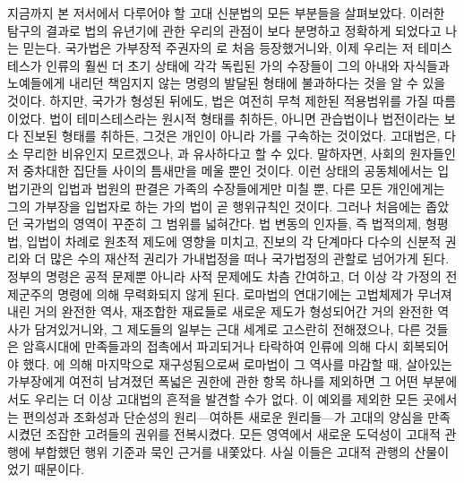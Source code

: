 지금까지 본 저서에서 다루어야 할 고대 신분법의 모든 부분들을 살펴보았다.
이러한 탐구의 결과로
법의 유년기에 관한 우리의 관점이 보다 분명하고 정확하게 되었다고
나는 믿는다.
국가법은
가부장적 주권자의 로
처음 등장했거니와,
이제 우리는
저 테미스테스가
인류의 훨씬 더 초기 상태에
각각 독립된 가의 수장들이 그의 아내와 자식들과 노예들에게 내리던
책임지지 않는 명령의
발달된 형태에 불과하다는 것을
알 수 있을 것이다.
하지만, 국가가 형성된 뒤에도,
법은 여전히 무척 제한된 적용범위를 가질 따름이었다.
법이 테미스테스라는 원시적 형태를 취하든,
아니면 관습법이나 법전이라는 보다 진보된 형태를 취하든,
그것은 개인이 아니라 가를 구속하는 것이었다.
고대법은,
다소 무리한 비유인지 모르겠으나, 과 유사하다고 할 수 있다.
말하자면, 사회의 원자들인 저 중차대한 집단들 사이의 틈새만을 메울 뿐인 것이다.
이런 상태의 공동체에서는
입법기관의 입법과 법원의 판결은
가족의 수장들에게만 미칠 뿐,
다른 모든 개인에게는
그의 가부장을 입법자로 하는
가의 법이 곧 행위규칙인 것이다.
그러나 처음에는 좁았던 국가법의 영역이 꾸준히 그 범위를 넓혀간다.
법 변동의 인자들, 즉
법적의제, 형평법, 입법이 차례로 원초적 제도에 영향을 미치고,
진보의 각 단계마다
다수의 신분적 권리와 더 많은 수의 재산적 권리가
가내법정을 떠나 국가법정의 관할로 넘어가게 된다.
정부의 명령은 공적 문제뿐 아니라 사적 문제에도 차츰 간여하고,
더 이상 각 가정의 전제군주의 명령에 의해 무력화되지 않게 된다.
로마법의 연대기에는
고법체제가 무너져내린 거의 완전한 역사,
재조합한 재료들로 새로운 제도가 형성되어간
거의 완전한 역사가 담겨있거니와,
그 제도들의 일부는 근대 세계로 고스란히 전해졌으나,
다른 것들은 암흑시대에 만족들과의 접촉에서 파괴되거나 타락하여
인류에 의해 다시 회복되어야 했다.
에 의해 마지막으로 재구성됨으로써
로마법이 그 역사를 마감할 때,
살아있는 가부장에게 여전히 남겨졌던 폭넓은 권한에 관한 항목 하나를 제외하면
그 어떤 부분에서도 우리는 더 이상 고대법의 흔적을 발견할 수가 없다.
이 예외를 제외한 모든 곳에서는
편의성과 조화성과 단순성의 원리---여하튼 새로운 원리들---가
고대의 양심을 만족시켰던 조잡한 고려들의 권위를 전복시켰다.
모든 영역에서
새로운 도덕성이 고대적 관행에 부합했던 행위 기준과 묵인 근거를
내쫓았다. 사실 이들은 고대적 관행의 산물이었기 때문이다.

